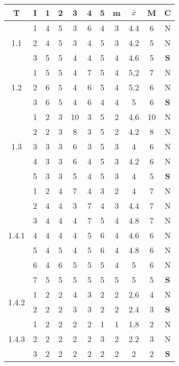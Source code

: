 \documentclass[11pt,a4paper,spanish,twoside]{report}
\begin{document}
\begin{table}[!h]
\centering
  \begin{tabular}{|c|c||c|c|c|c|c||c|c|c||c|}
    \hline
    \textbf{T} & \textbf{I} & \textbf{1} &
    \textbf{2} & \textbf{3} & \textbf{4} & \textbf{5} & \textbf{m}
    &\textbf{$\bar{x}$} &\textbf{M} & \textbf{C}\\
    \hline \hline
    \multirow{3}{*}{1.1} & 1 & 4 & 5 & 3 & 6 & 4 & 3 & 4.4 & 6 & N \\
    & 2 & 4 & 5 & 3 & 4 & 5 & 3 & 4.2 & 5 & N\\
    & 3 & 5 & 5 & 4 & 4 & 5 & 4 & 4.6 & 5 & \textbf{S}\\
    \hline

    \multirow{3}{*}{1.2} & 1 & 5 & 5 & 4 & 7 & 5 & 4 & 5,2 & 7 & N\\
    & 2 & 6 & 5 & 4 & 6 & 5 & 4 & 5.2 & 6 & N\\
    & 3 & 6 & 5 & 4 & 6 & 4 & 4 & 5 & 6 & \textbf{S} \\    
    \hline

    \multirow{5}{*}{1.3} & 1 & 2 & 3 & 10 & 3 & 5 & 2 & 4,6 & 10& N\\
    & 2 & 2 & 3 & 8 & 3 & 5 & 2 & 4.2 & 8 & N \\
    & 3 & 3 & 3 & 6 & 3 & 5 & 3 & 4 & 6 & N \\
    & 4 & 3 & 3 & 6 & 4 & 5 & 3 & 4.2 & 6 & N \\
    & 5 & 3 & 3 & 5 & 4 & 5 & 3 & 4 & 5 & \textbf{S} \\
    \hline

    \multirow{7}{*}{1.4.1} & 1 & 2 & 4 & 7 & 4 & 3 & 2 & 4 & 7 & N\\
    & 2 & 4 & 4 & 3 & 7 & 4 & 3 & 4.4 & 7 & N \\
    & 3 & 4 & 4 & 4 & 7 & 5 & 4 & 4.8 & 7 & N \\
    & 4 & 4 & 4 & 4 & 5 & 6 & 4 & 4.6 & 6 & N \\
    & 5 & 4 & 5 & 4 & 5 & 6 & 4 & 4.8 & 6 & N \\
    & 6 & 4 & 6 & 5 & 5 & 5 & 4 & 5 & 6 & N \\
    & 7 & 5 & 5 & 5 & 5 & 5 & 5 & 5 & 5 & \textbf{S} \\
    \hline

    \multirow{2}{*}{1.4.2} & 1 & 2 & 2 & 4 & 3 & 2 & 2 & 2,6 & 4 & N\\
    & 2 & 2 & 2 & 3 & 3 & 2 & 2 & 2.4 & 3 & \textbf{S} \\
    \hline

    \multirow{3}{*}{1.4.3} & 1 & 2 & 2 & 2 & 2 & 1 & 1 & 1,8 & 2 & N\\
    & 2 & 2 & 2 & 2 & 2 & 3 & 2 & 2.2 & 3 & N \\
    & 3 & 2 & 2 & 2 & 2 & 2 & 2 & 2 & 2 & \textbf{S} \\
    \hline


\end{tabular}
\end{table}
\end{document}
